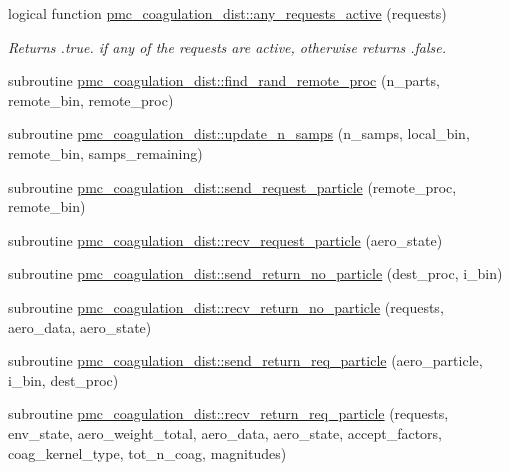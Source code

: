 \begin{DoxyCompactItemize}
\item 
logical function \mbox{\hyperlink{namespacepmc__coagulation__dist_a343ec0694b50e82dc5d833f42c9ed359}{pmc\+\_\+coagulation\+\_\+dist\+::any\+\_\+requests\+\_\+active}} (requests)
\begin{DoxyCompactList}\small\item\em Returns {\ttfamily }.true. if any of the requests are active, otherwise returns {\ttfamily }.false. \end{DoxyCompactList}\item 
subroutine \mbox{\hyperlink{namespacepmc__coagulation__dist_a651e57c3eb431e54cc014e0121d700aa}{pmc\+\_\+coagulation\+\_\+dist\+::find\+\_\+rand\+\_\+remote\+\_\+proc}} (n\+\_\+parts, remote\+\_\+bin, remote\+\_\+proc)
\item 
subroutine \mbox{\hyperlink{namespacepmc__coagulation__dist_a16eacae36a5a5a01dc3bbfdd96f7bdb3}{pmc\+\_\+coagulation\+\_\+dist\+::update\+\_\+n\+\_\+samps}} (n\+\_\+samps, local\+\_\+bin, remote\+\_\+bin, samps\+\_\+remaining)
\item 
subroutine \mbox{\hyperlink{namespacepmc__coagulation__dist_a99ffd44c548887bda417e61c67ea0bbc}{pmc\+\_\+coagulation\+\_\+dist\+::send\+\_\+request\+\_\+particle}} (remote\+\_\+proc, remote\+\_\+bin)
\item 
subroutine \mbox{\hyperlink{namespacepmc__coagulation__dist_addc40be25e3ef491aa13a10e628afbf9}{pmc\+\_\+coagulation\+\_\+dist\+::recv\+\_\+request\+\_\+particle}} (aero\+\_\+state)
\item 
subroutine \mbox{\hyperlink{namespacepmc__coagulation__dist_a6fd21d148a797e93278b9ca7347b2040}{pmc\+\_\+coagulation\+\_\+dist\+::send\+\_\+return\+\_\+no\+\_\+particle}} (dest\+\_\+proc, i\+\_\+bin)
\item 
subroutine \mbox{\hyperlink{namespacepmc__coagulation__dist_a189b1c8e85725b70f1b80f44cdf8a2e1}{pmc\+\_\+coagulation\+\_\+dist\+::recv\+\_\+return\+\_\+no\+\_\+particle}} (requests, aero\+\_\+data, aero\+\_\+state)
\item 
subroutine \mbox{\hyperlink{namespacepmc__coagulation__dist_af9f9db875f5df9d3e69ce63accf95d98}{pmc\+\_\+coagulation\+\_\+dist\+::send\+\_\+return\+\_\+req\+\_\+particle}} (aero\+\_\+particle, i\+\_\+bin, dest\+\_\+proc)
\item 
subroutine \mbox{\hyperlink{namespacepmc__coagulation__dist_a0e6ac760034791004d9e50f77c786ed4}{pmc\+\_\+coagulation\+\_\+dist\+::recv\+\_\+return\+\_\+req\+\_\+particle}} (requests, env\+\_\+state, aero\+\_\+weight\+\_\+total, aero\+\_\+data, aero\+\_\+state, accept\+\_\+factors, coag\+\_\+kernel\+\_\+type, tot\+\_\+n\+\_\+coag, magnitudes)

\end{DoxyCompactItemize}
